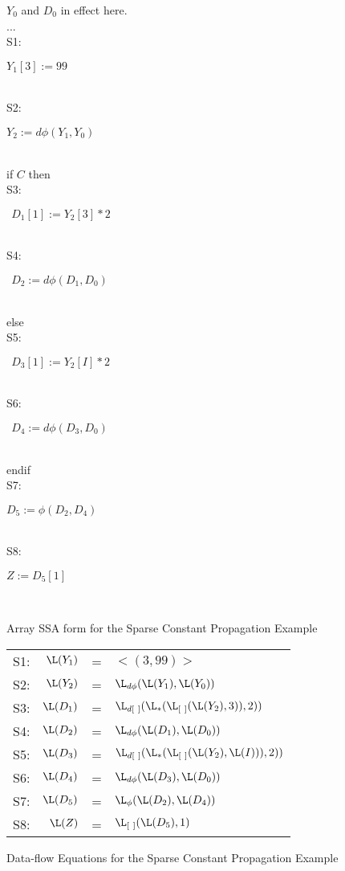 \begin{figure}%
\begin{center}
\parbox{3.0in}{
\begin{programa}
\Tb $Y_0$ and $D_0$ in effect here. \\
\Tb  ... \\
\mbox{S1:}\Tb \parbox{1.5in} {$Y_1[3] := 99$}  \\
\mbox{S2:}\Tb \parbox{1.5in} {$Y_2 := d\phi(Y_1,Y_0)$}  \\
\Tb  if $C$ then \\
\mbox{S3:}\Tb \parbox{1.5in} {$\ \ D_1[1] := Y_2[3] * 2$}  \\
\mbox{S4:}\Tb \parbox{1.5in} {$\ \ D_2 := d\phi(D_1,D_0)$}  \\
\Tb else \\
\mbox{S5:}\Tb \parbox{1.5in} {$\ \ D_3[1] := Y_2[I] * 2$}  \\
\mbox{S6:}\Tb \parbox{1.5in} {$\ \ D_4 := d\phi(D_3,D_0)$}  \\
\Tb endif \\
\mbox{S7:}\Tb \parbox{1.5in} {$D_5 := \phi(D_2,D_4)$}  \\
\mbox{S8:}\Tb \parbox{1.5in} {$Z := D_5[1]$}  \\
\end{programa}
}
\end{center}
\caption{Array SSA form for the Sparse Constant Propagation Example}
\label{fig:sc-ex-ssa}
\end{figure}

\begin{figure}%
\begin{center}
\begin{tabular}{r r c l}
\mbox{S1:} & $\L(Y_1)$ & = & $<(3,99)>$ \\
\mbox{S2:} & $\L(Y_2)$ & = & $\L_{d\phi} (\L(Y_1), \L(Y_0))$ \\
\mbox{S3:} & $\L(D_1)$ & = & $\L_{d[\ ]}(\L_*(\L_{[\ ]}(\L(Y_2),3)), 2))$ \\
\mbox{S4:} & $\L(D_2)$ & = & $\L_{d\phi} (\L(D_1), \L(D_0))$ \\
\mbox{S5:} & $\L(D_3)$ & = & $\L_{d[\ ]}(\L_*(
\L_{[\ ]}(\L(Y_2),\L(I)))
, 2))$ \\
\mbox{S6:} & $\L(D_4)$ & = & $\L_{d\phi} (\L(D_3), \L(D_0))$ \\
\mbox{S7:} & $\L(D_5)$ & = & $\L_{\phi}(\L(D_2),\L(D_4))$ \\
\mbox{S8:} & $\L(Z)$ & =  & $\L_{[\ ]}(\L(D_5), 1)$
\end{tabular}
\end{center}
\caption{Data-flow Equations for the Sparse Constant Propagation Example}
\label{fig:sc-ex-df}
\end{figure}



